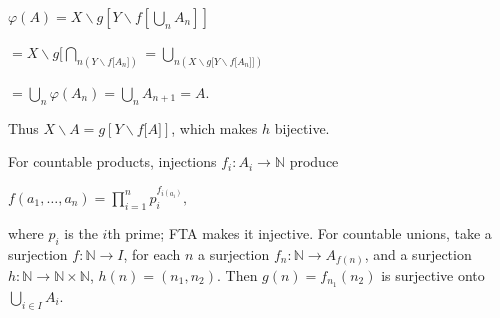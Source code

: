 \(\varphi(A) = X \smallsetminus g\left\lbrack {Y \smallsetminus f\left\lbrack {\bigcup_{n}A_{n}} \right\rbrack} \right\rbrack\)

\(= X \smallsetminus g\lbrack\bigcap_{n{({Y \smallsetminus f{\lbrack A_{n}\rbrack}})}} = \bigcup_{n{({X \smallsetminus g{\lbrack{Y \smallsetminus f{\lbrack A_{n}\rbrack}}\rbrack}})}}\)

\(= \bigcup_{n}\varphi\left( A_{n} \right) = \bigcup_{n}A_{n + 1} = A.\)

Thus \(X \smallsetminus A = g\left\lbrack {Y \smallsetminus f\lbrack A\rbrack} \right\rbrack\), which makes \(h\) bijective.

For countable products, injections \(f_{i}:A_{i}\rightarrow\mathbb{N}\) produce

\(f\left( {a_{1},\ldots,a_{n}} \right) = \prod_{i = 1}^{n}p_{i}^{f_{i{(a_{i})}}},\)

where \(p_{i}\) is the \(i\)th prime; FTA makes it injective. For countable unions, take a surjection \(f:\mathbb{N}\rightarrow I\), for each \(n\) a surjection \(f_{n}:\mathbb{N}\rightarrow A_{f{(n)}}\), and a surjection \(h:\mathbb{N}\rightarrow\mathbb{N} \times \mathbb{N}\), \(h(n) = \left( {n_{1},n_{2}} \right)\). Then \(g(n) = f_{n_{1}}\left( n_{2} \right)\) is surjective onto \(\bigcup_{i \in I}A_{i}\).
